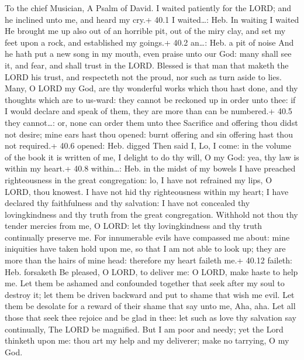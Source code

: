 To the chief Musician, A Psalm of David.  I waited patiently
for the LORD; and he inclined unto me, and heard my cry.+ 40.1 I
waited\ldots: Heb. In waiting I waited  He brought me up
also out of an horrible pit, out of the miry clay, and set my feet upon
a rock, and established my goings.+ 40.2 an\ldots: Heb. a pit of noise
 And he hath put a new song in my mouth, even praise unto
our God: many shall see it, and fear, and shall trust in the LORD.
 Blessed is that man that maketh the LORD his trust, and
respecteth not the proud, nor such as turn aside to lies. 
Many, O LORD my God, are thy wonderful works which thou hast done, and
thy thoughts which are to us-ward: they cannot be reckoned up in order
unto thee: if I would declare and speak of them, they are more than can
be numbered.+ 40.5 they cannot\ldots: or, none can order them unto thee
 Sacrifice and offering thou didst not desire; mine ears
hast thou opened: burnt offering and sin offering hast thou not
required.+ 40.6 opened: Heb. digged  Then said I, Lo, I
come: in the volume of the book it is written of me,  I
delight to do thy will, O my God: yea, thy law is within my heart.+ 40.8
within\ldots: Heb. in the midst of my bowels  I have
preached righteousness in the great congregation: lo, I have not
refrained my lips, O LORD, thou knowest.  I have not hid
thy righteousness within my heart; I have declared thy faithfulness and
thy salvation: I have not concealed thy lovingkindness and thy truth
from the great congregation.  Withhold not thou thy tender
mercies from me, O LORD: let thy lovingkindness and thy truth
continually preserve me.  For innumerable evils have
compassed me about: mine iniquities have taken hold upon me, so that I
am not able to look up; they are more than the hairs of mine head:
therefore my heart faileth me.+ 40.12 faileth: Heb. forsaketh
 Be pleased, O LORD, to deliver me: O LORD, make haste to
help me.  Let them be ashamed and confounded together that
seek after my soul to destroy it; let them be driven backward and put to
shame that wish me evil.  Let them be desolate for a reward
of their shame that say unto me, Aha, aha.  Let all those
that seek thee rejoice and be glad in thee: let such as love thy
salvation say continually, The LORD be magnified.  But I am
poor and needy; yet the Lord thinketh upon me: thou art my help and my
deliverer; make no tarrying, O my God.

